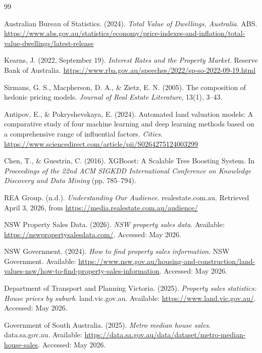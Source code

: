 \documentclass[a4paper,12pt]{article}
\begin{document}
\begin{thebibliography}{99}

Australian Bureau of Statistics. (2024). \emph{Total Value of Dwellings, Australia}. ABS. \url{https://www.abs.gov.au/statistics/economy/price-indexes-and-inflation/total-value-dwellings/latest-release}

Kearns, J. (2022, September 19). \emph{Interest Rates and the Property Market}. Reserve Bank of Australia. \url{https://www.rba.gov.au/speeches/2022/sp-so-2022-09-19.html}

Sirmans, G. S., Macpherson, D. A., \& Zietz, E. N. (2005). The composition of hedonic pricing models. \emph{Journal of Real Estate Literature}, 13(1), 3--43.

Antipov, E., \& Pokryshevskaya, E. (2024). Automated land valuation models: 
A comparative study of four machine learning and deep learning methods based on a comprehensive range of influential factors. \emph{Cities}. 
 \url{https://www.sciencedirect.com/article/pii/S0264275124003299}

Chen, T., \& Guestrin, C. (2016). XGBoost: A Scalable Tree Boosting System. In \emph{Proceedings of the 22nd ACM SIGKDD International Conference on Knowledge Discovery and Data Mining} (pp. 785--794).

REA Group. (n.d.). \emph{Understanding Our Audience}. realestate.com.au. Retrieved April 3, 2026, from \url{https://media.realestate.com.au/audience/}

NSW Property Sales Data. (2026). \emph{NSW property sales data}. Available: \url{https://nswpropertysalesdata.com/}. Accessed: May 2026.

NSW Government. (2024). \emph{How to find property sales information}. NSW Government. Available: \url{https://www.nsw.gov.au/housing-and-construction/land-values-nsw/how-to-find-property-sales-information}. Accessed: May 2026.

Department of Transport and Planning Victoria. (2025). \emph{Property sales statistics: House prices by suburb}. land.vic.gov.au. Available: \url{https://www.land.vic.gov.au/}. Accessed: May 2026.

Government of South Australia. (2025). \emph{Metro median house sales}. data.sa.gov.au. Available: \url{https://data.sa.gov.au/data/dataset/metro-median-house-sales}. Accessed: May 2026.


\end{thebibliography}
\end{document}

